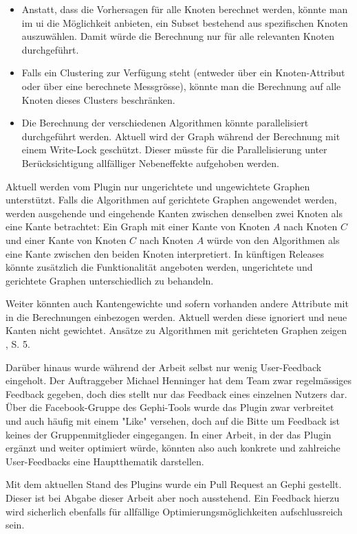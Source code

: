 \begin{itemize}
    \item Anstatt, dass die Vorhersagen für alle Knoten berechnet werden, könnte man im \acs{ui} die Möglichkeit anbieten, ein Subset bestehend aus spezifischen Knoten auszuwählen. Damit würde die Berechnung nur für alle relevanten Knoten durchgeführt.
    \item Falls ein Clustering zur Verfügung steht (entweder über ein Knoten-Attribut oder über eine berechnete Messgrösse), könnte man die Berechnung auf alle Knoten dieses Clusters beschränken.
    \item Die Berechnung der verschiedenen Algorithmen könnte parallelisiert durchgeführt werden. Aktuell wird der Graph während der Berechnung mit einem Write-Lock geschützt. Dieser müsste für die Parallelisierung unter Berücksichtigung allfälliger Nebeneffekte aufgehoben werden.
\end{itemize}

Aktuell werden vom Plugin nur ungerichtete und ungewichtete Graphen unterstützt.
Falls die Algorithmen auf gerichtete Graphen angewendet werden, werden ausgehende und eingehende Kanten zwischen denselben zwei Knoten als eine Kante betrachtet:
Ein Graph mit einer Kante von Knoten $A$ nach Knoten $C$ und einer Kante von Knoten $C$ nach Knoten $A$ würde von den Algorithmen als eine Kante zwischen den beiden Knoten interpretiert.
In künftigen Releases könnte zusätzlich die Funktionalität angeboten werden, ungerichtete und gerichtete Graphen unterschiedlich zu behandeln.

Weiter könnten auch Kantengewichte und sofern vorhanden andere Attribute mit in die Berechnungen einbezogen werden.
Aktuell werden diese ignoriert und neue Kanten nicht gewichtet. Ansätze zu Algorithmen mit gerichteten Graphen zeigen \citeauthor{gasulla_pdf_2014} \citeyear{gasulla_pdf_2014}, S. 5.

Darüber hinaus wurde während der Arbeit selbst nur wenig User-Feedback eingeholt.
Der Auftraggeber Michael Henninger hat dem Team zwar regelmässiges Feedback gegeben, doch dies stellt nur das Feedback eines einzelnen Nutzers dar.
Über die Facebook-Gruppe des Gephi-Tools wurde das Plugin zwar verbreitet und auch häufig mit einem "Like" versehen, doch auf die Bitte um Feedback ist keines der Gruppenmitglieder eingegangen.
In einer Arbeit, in der das Plugin ergänzt und weiter optimiert würde, könnten also auch konkrete und zahlreiche User-Feedbacks eine Hauptthematik darstellen.

Mit dem aktuellen Stand des Plugins wurde ein Pull Request an Gephi gestellt. Dieser ist bei Abgabe dieser Arbeit aber noch ausstehend.
Ein Feedback hierzu wird sicherlich ebenfalls für allfällige Optimierungsmöglichkeiten aufschlussreich sein.
